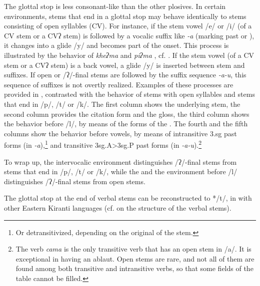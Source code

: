  
The glottal stop is less consonant-like than the other plosives. In certain environments, stems that end in a glottal stop may behave identically to  stems consisting of open syllables (CV). For instance, if the stem vowel /e/ or /i/ (of a CV stem or a CVʔ stem) is followed by a vocalic suffix like \emph{-a} (marking past or ), it changes into a glide /y/ and becomes part of the onset. This process is illustrated by the behavior of \emph{kheʔma}  and \emph{piʔma} , cf. . If the stem vowel (of a CV stem or a CVʔ stem) is a back vowel, a glide /y/ is inserted between stem and suffixes. If open or /ʔ/-final stems are followed by the suffix sequence \emph{-a-u}, this sequence of suffixes is not overtly realized. Examples of these processes are provided in , contrasted with the behavior of stems with open syllables and stems that end in /p/, /t/ or /k/. The first column shows the underlying stem, the second column provides the citation form and the gloss, the third column shows the behavior before /l/, by means of the forms of the . The fourth and the fifth columns show the behavior before vowels, by means of intransitive {\sc 3.sg} past forms (in \emph{-a}),\footnote{Or detransitivized, depending on the original  of the stem.} and transitive {\sc 3sg.A>3sg.P} past forms (in \emph{-a-u}).\footnote{The verb \emph{cama}  is the only transitive verb that has an open stem in /a/. It is exceptional in having an ablaut. Open stems are rare, and not all of them are found among both transitive and intransitive verbs, so that some fields of the table cannot be filled.}  

To wrap up, the intervocalic environment distinguishes /ʔ/-final stems from stems that end in /p/, /t/ or /k/, while the  and the environment before /l/ distinguishes /ʔ/-final stems from open stems. 

The glottal stop at the end of verbal stems can be reconstructed to */t/, in  with other Eastern Kiranti languages (cf.  on the structure of the verbal stems). 

